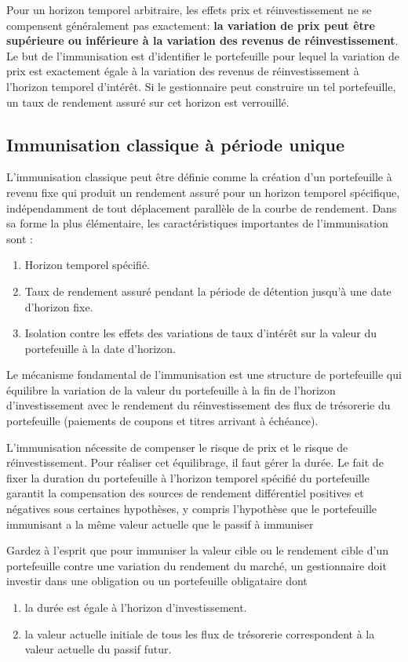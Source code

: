 \documentclass[12pt]{article}
\begin{document}
\vspace{0.5cm}

Pour un horizon temporel arbitraire, les effets prix et réinvestissement ne se compensent généralement pas exactement: \textbf{la variation de prix peut être supérieure ou inférieure à la variation des revenus de réinvestissement}.  Le but de l'immunisation est d'identifier le portefeuille pour lequel la variation de prix est exactement égale à la variation des revenus de réinvestissement à l'horizon temporel d'intérêt. Si le gestionnaire peut construire un tel portefeuille, un taux de rendement assuré sur cet horizon est verrouillé.
\subsection{Immunisation classique à période unique}
L'immunisation classique peut être définie comme la création d'un portefeuille à revenu fixe qui produit un rendement assuré pour un horizon temporel spécifique, indépendamment de tout déplacement parallèle de la courbe de rendement. Dans sa forme la plus élémentaire, les caractéristiques importantes de l'immunisation sont :
\begin{enumerate}
\item Horizon temporel spécifié.
\item Taux de rendement assuré pendant la période de détention jusqu'à une date d'horizon fixe.
\item Isolation contre les effets des variations de taux d'intérêt sur la valeur du portefeuille à la date d'horizon.
\end{enumerate}
Le mécanisme fondamental de l'immunisation est une structure de portefeuille qui équilibre la variation de la valeur du portefeuille à la fin de l'horizon d'investissement avec le rendement du réinvestissement des flux de trésorerie du portefeuille (paiements de coupons et titres arrivant à échéance). 

\vspace{0.5cm}

L'immunisation nécessite de compenser le risque de prix et le risque de réinvestissement. Pour réaliser cet équilibrage, il faut gérer la durée.  Le fait de fixer la duration du portefeuille à l'horizon temporel spécifié du portefeuille garantit la compensation des sources de rendement différentiel positives et négatives sous certaines hypothèses, y compris l'hypothèse que le portefeuille immunisant a la même valeur actuelle que le passif à immuniser

\vspace{0.5cm}
Gardez à l'esprit que pour immuniser la valeur cible ou le rendement cible d'un portefeuille contre une variation du rendement du marché, un gestionnaire doit investir dans une obligation ou un portefeuille obligataire dont
\begin{enumerate}
\item la durée est égale à l'horizon d'investissement.
\item la valeur actuelle initiale de tous les flux de trésorerie correspondent à la valeur actuelle du passif futur.
\end{enumerate}
\end{document}
